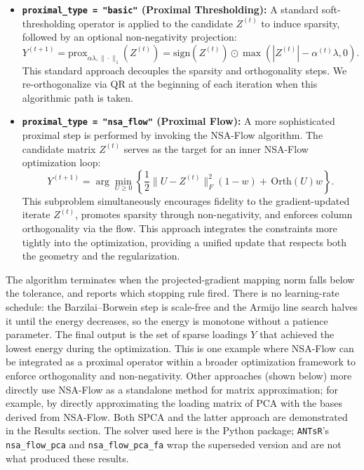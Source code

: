 \documentclass[
]{article}
\begin{document}
\begin{itemize}
\item
  \textbf{\texttt{proximal\_type\ =\ "basic"} (Proximal Thresholding):} A standard soft-thresholding operator is applied to the candidate \(Z^{(t)}\) to induce sparsity, followed by an optional non-negativity projection:
  \[
  Y^{(t+1)} = \text{prox}_{\alpha\lambda, \|\cdot\|_1}(Z^{(t)}) = \text{sign}(Z^{(t)}) \odot \max(|Z^{(t)}| - \alpha^{(t)}\lambda, 0).
  \]
  This standard approach decouples the sparsity and orthogonality steps. We re-orthogonalize via QR at the beginning of each iteration when this algorithmic path is taken.
\item
  \textbf{\texttt{proximal\_type\ =\ "nsa\_flow"} (Proximal Flow):} A more sophisticated proximal step is performed by invoking the NSA-Flow algorithm. The candidate matrix \(Z^{(t)}\) serves as the target for an inner NSA-Flow optimization loop:
  \[
  Y^{(t+1)} = \arg\min_{U \ge 0} \left\{ \frac{1}{2} \| U - Z^{(t)} \|_F^2 (1-w) + \, \text{Orth}(U) w \right\}.
  \]
  This subproblem simultaneously encourages fidelity to the gradient-updated iterate \(Z^{(t)}\), promotes sparsity through non-negativity, and enforces column orthogonality via the flow. This approach integrates the constraints more tightly into the optimization, providing a unified update that respects both the geometry and the regularization.
\end{itemize}

The algorithm terminates when the projected-gradient mapping norm falls below the tolerance, and reports which stopping rule fired. There is no learning-rate schedule: the Barzilai--Borwein step is scale-free and the Armijo line search halves it until the energy decreases, so the energy is monotone without a patience parameter. The final output is the set of sparse loadings \(Y\) that achieved the lowest energy during the optimization. This is one example where NSA-Flow can be integrated as a proximal operator within a broader optimization framework to enforce orthogonality and non-negativity. Other approaches (shown below) more directly use NSA-Flow as a standalone method for matrix approximation; for example, by directly approximating the loading matrix of PCA with the bases derived from NSA-Flow. Both SPCA and the latter approach are demonstrated in the Results section. The solver used here is the Python package; \texttt{ANTsR}'s \texttt{nsa\_flow\_pca} and \texttt{nsa\_flow\_pca\_fa} wrap the superseded version and are not what produced these results.
\end{document}
